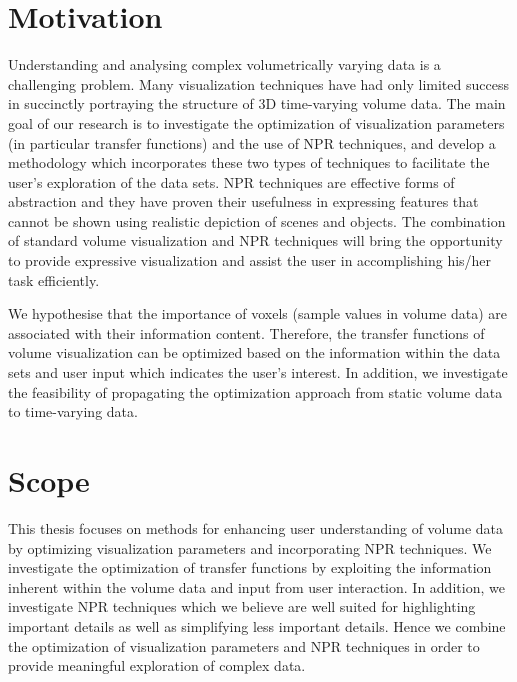 \section{Motivation \label{motivation}}
Understanding and analysing complex volumetrically varying data is a challenging problem.
Many visualization techniques have had only limited success in succinctly portraying the structure of 3D time-varying volume data.
The main goal of our research is to investigate the optimization of visualization parameters (in particular transfer functions) and the use of NPR techniques, and develop a methodology which incorporates these two types of techniques to facilitate the user's exploration of the data sets. NPR techniques are effective forms of abstraction and they have proven their usefulness in expressing features that cannot be shown using realistic depiction of scenes and objects. The combination of standard volume visualization and NPR techniques will bring the opportunity to provide expressive visualization and assist the user in accomplishing his/her task efficiently.

We hypothesise that the importance of voxels (sample values in volume data) are associated with their information content. Therefore, the transfer functions of volume visualization can be optimized based on the information within the data sets and user input which indicates the user's interest.
In addition, we investigate the feasibility of propagating the optimization approach from static volume data to time-varying data.


\section{Scope}
This thesis focuses on methods for enhancing user understanding of volume data by optimizing visualization parameters and incorporating NPR techniques.
We investigate the optimization of transfer functions by exploiting the information inherent within the volume data and input from user interaction.
In addition, we investigate NPR techniques which we believe are well suited for highlighting important details as well as simplifying less important details. Hence we combine the optimization of visualization parameters and NPR techniques in order to provide meaningful exploration of complex data.

